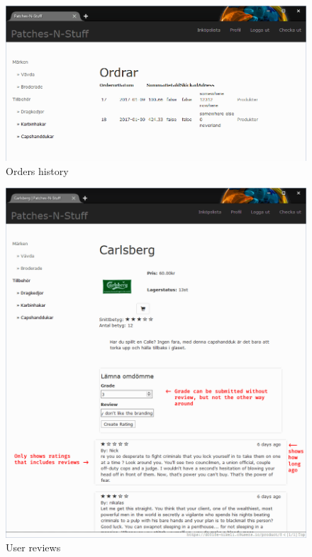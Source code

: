 \documentclass[paper=a4, fontsize=11pt]{report} %
\begin{document}
\begin{figure}
	\includegraphics[width=0.9\paperwidth]{artifacts/stories/12_orders.png}
	\caption{Orders history}
	\label{fig:orders}
\end{figure}

\begin{figure}
	\includegraphics[width=0.9\paperwidth]{artifacts/stories/13_comments.png}
	\caption{User reviews}
	\label{fig:comments}
\end{figure}
\end{document}
